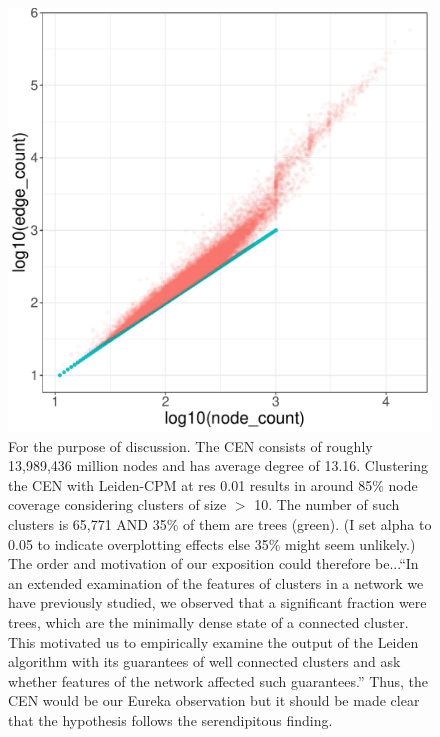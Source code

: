 \documentclass[12pt, oneside]{article}   	%
\begin{document}
\begin{figure}[H]
\centering
\includegraphics[width=0.5\linewidth]{cen_fig1.pdf}
\caption{For the purpose of discussion. The CEN consists of roughly 13,989,436 million nodes and has average degree of 13.16. Clustering the CEN with Leiden-CPM at res 0.01 results in around 85\% node coverage considering clusters of size $>$ 10.  The number of such clusters is 65,771 AND 35\% of them are trees (green). (I set alpha to 0.05 to indicate overplotting effects else 35\% might seem unlikely.) The order and motivation of our exposition could therefore be...``In an extended examination of the features of clusters in a network we have previously studied, we observed that a significant fraction were trees, which are the minimally dense state of a connected cluster. This motivated us to empirically examine the output of the Leiden algorithm with its guarantees of well connected clusters and ask whether features of the network affected such guarantees.'' Thus, the CEN would be our Eureka observation but it should be made clear that the hypothesis follows the serendipitous finding.}
\end{figure}
\end{document}
